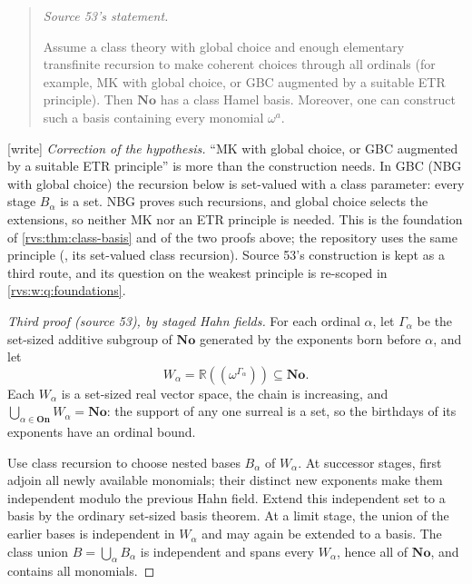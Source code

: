 \documentclass[11pt,letterpaper]{article}
\numberwithin{equation}{section}
\theoremstyle{definition}
\theoremstyle{remark}
\newcommand{\No}{\mathbf{No}}
\newcommand{\On}{\mathbf{On}}
\newcommand{\R}{\mathbb{R}}
\newcommand{\wtag}{\textup{[write]}}%
\begin{document}
\begin{quote}
\emph{Source 53's statement.}

Assume a class theory with global choice and enough elementary transfinite recursion
to make coherent choices through all ordinals (for example, MK with global choice,
or GBC augmented by a suitable ETR principle). Then $\No$ has a class Hamel basis.
Moreover, one can construct such a basis containing every monomial $\omega^a$.
\end{quote}
\noindent\wtag{} \emph{Correction of the hypothesis.}  ``MK with global
choice, or GBC augmented by a suitable ETR principle'' is more than the
construction needs.  In GBC (NBG with global choice) the recursion below is
set-valued with a class parameter: every stage \(B_\alpha\) is a set.  NBG
proves such recursions, and global choice selects the extensions, so
neither MK nor an ETR principle is needed.  This is the foundation of
\cref{rvs:thm:class-basis} and of the two proofs above; the repository
uses the same principle (, its set-valued
class recursion).  Source 53's construction is kept as a third route, and
its question on the weakest principle is re-scoped in
\cref{rvs:w:q:foundations}.
\begin{proof}[Third proof (source 53), by staged Hahn fields]

For each ordinal $\alpha$, let $\Gamma_\alpha$ be the set-sized additive subgroup
of $\No$ generated by the exponents born before $\alpha$, and let
\[
  W_\alpha=\R((\omega^{\Gamma_\alpha}))\subseteq\No.
\]
Each $W_\alpha$ is a set-sized real vector space, the chain is increasing, and
$\bigcup_{\alpha\in\On}W_\alpha=\No$: the support of any one surreal is a set,
so the birthdays of its exponents have an ordinal bound.

Use class recursion to choose nested bases $B_\alpha$ of $W_\alpha$. At successor
stages, first adjoin all newly available monomials; their distinct new exponents
make them independent modulo the previous Hahn field. Extend this independent set
to a basis by the ordinary set-sized basis theorem. At a limit stage, the union of
the earlier bases is independent in $W_\alpha$ and may again be extended to a basis.
The class union $B=\bigcup_\alpha B_\alpha$ is independent and spans every
$W_\alpha$, hence all of $\No$, and contains all monomials.
\end{proof}
\end{document}
